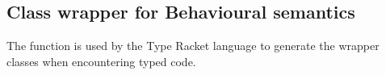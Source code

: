 \documentclass[a4paper,USenglish]{tex/lipics-v2016}
\begin{document}
% 
% 
% 
% 



\subsection{Class wrapper for Behavioural semantics}\label{wrap}

The  function is used by the Type Racket language to generate the wrapper classes
when encountering typed code.
\end{document}
